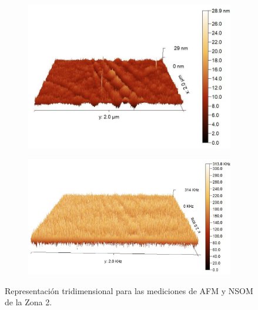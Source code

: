 \begin{figure}[H]
    \centering
    \begin{subfigure}[b]{0.45\textwidth}
        \centering
        \includegraphics[width = 1\textwidth]{figures/chap4/cdte-ag/afm-nsom-results/2um/CdTe_Ag_afm_3d.jpg}
    \end{subfigure}\hfill
    \begin{subfigure}[b]{0.45\textwidth}
        \centering
        \includegraphics[width = 1\textwidth]{figures/chap4/cdte-ag/afm-nsom-results/2um/CdTe_Ag_nsom_3d.jpg}
    \end{subfigure}

\caption{Representación tridimensional para las mediciones de AFM y NSOM de la Zona 2.}
\label{fig:afm-nsom-results-2um-3d}
\end{figure}

